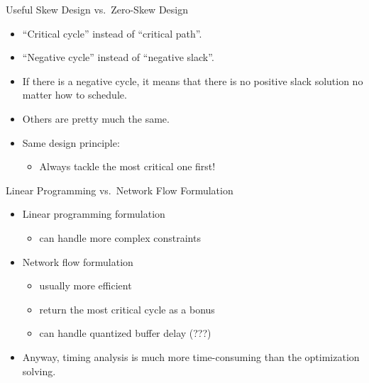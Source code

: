 \documentclass[
  ignorenonframetext,
]{beamer}
\providecommand{\tightlist}{%
  \setlength{\itemsep}{0pt}\setlength{\parskip}{0pt}}
\begin{document}
\begin{frame}{Useful Skew Design vs.~Zero-Skew Design}
\protect\hypertarget{useful-skew-design-vs.-zero-skew-design}{}
\begin{itemize}
\tightlist
\item
  ``Critical cycle'' instead of ``critical path''.
\item
  ``Negative cycle'' instead of ``negative slack''.
\item
  If there is a negative cycle, it means that there is no positive slack
  solution no matter how to schedule.
\item
  Others are pretty much the same.
\item
  Same design principle:

  \begin{itemize}
  \tightlist
  \item
    Always tackle the most critical one first!
  \end{itemize}
\end{itemize}
\end{frame}

\begin{frame}{Linear Programming vs.~Network Flow Formulation}
\protect\hypertarget{linear-programming-vs.-network-flow-formulation}{}
\begin{itemize}
\tightlist
\item
  Linear programming formulation

  \begin{itemize}
  \tightlist
  \item
    can handle more complex constraints
  \end{itemize}
\item
  Network flow formulation

  \begin{itemize}
  \tightlist
  \item
    usually more efficient
  \item
    return the most critical cycle as a bonus
  \item
    can handle quantized buffer delay (???)
  \end{itemize}
\item
  Anyway, timing analysis is much more time-consuming than the
  optimization solving.
\end{itemize}
\end{frame}
\end{document}
